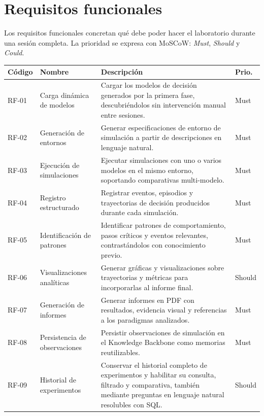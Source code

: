 \section{Requisitos funcionales}

Los requisitos funcionales concretan qué debe poder hacer el laboratorio
durante una sesión completa. La prioridad se expresa con MoSCoW:
\emph{Must}, \emph{Should} y \emph{Could}.

\begin{table}[H]
\begin{center}
\scriptsize
\setlength{\tabcolsep}{4pt}
\renewcommand{\arraystretch}{1.08}
\begin{tabular}{|>{\raggedright\arraybackslash}p{1.08cm}|>{\raggedright\arraybackslash}p{2.45cm}|>{\raggedright\arraybackslash}p{5.92cm}|>{\raggedright\arraybackslash}p{0.95cm}|} \hline
\textbf{Código} & \textbf{Nombre} & \textbf{Descripción} & \textbf{Prio.} \\ \hline
RF-01 & Carga dinámica de modelos & Cargar los modelos de decisión generados por la primera fase, descubriéndolos sin intervención manual entre sesiones. & Must \\ \hline
RF-02 & Generación de entornos & Generar especificaciones de entorno de simulación a partir de descripciones en lenguaje natural. & Must \\ \hline
RF-03 & Ejecución de simulaciones & Ejecutar simulaciones con uno o varios modelos en el mismo entorno, soportando comparativas multi-modelo. & Must \\ \hline
RF-04 & Registro estructurado & Registrar eventos, episodios y trayectorias de decisión producidos durante cada simulación. & Must \\ \hline
RF-05 & Identificación de patrones & Identificar patrones de comportamiento, pasos críticos y eventos relevantes, contrastándolos con conocimiento previo. & Must \\ \hline
RF-06 & Visualizaciones analíticas & Generar gráficas y visualizaciones sobre trayectorias y métricas para incorporarlas al informe final. & Should \\ \hline
RF-07 & Generación de informes & Generar informes en PDF con resultados, evidencia visual y referencias a los paradigmas analizados. & Must \\ \hline
RF-08 & Persistencia de observaciones & Persistir observaciones de simulación en el Knowledge Backbone como memorias reutilizables. & Must \\ \hline
RF-09 & Historial de experimentos & Conservar el historial completo de experimentos y habilitar su consulta, filtrado y comparativa, también mediante preguntas en lenguaje natural resolubles con SQL. & Should \\ \hline

\end{tabular}
\end{center}
\end{table}
